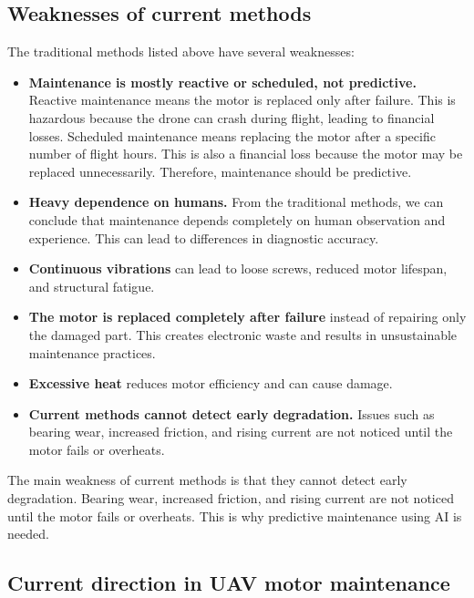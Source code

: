 \subsection*{Weaknesses of current methods}

The traditional methods listed above have several weaknesses:

\begin{itemize}
    \item \textbf{Maintenance is mostly reactive or scheduled, not predictive.} Reactive maintenance means the motor is replaced only after failure. This is hazardous because the drone can crash during flight, leading to financial losses. Scheduled maintenance means replacing the motor after a specific number of flight hours. This is also a financial loss because the motor may be replaced unnecessarily. Therefore, maintenance should be predictive.
    
    \item \textbf{Heavy dependence on humans.} From the traditional methods, we can conclude that maintenance depends completely on human observation and experience. This can lead to differences in diagnostic accuracy.
    
    \item \textbf{Continuous vibrations} can lead to loose screws, reduced motor lifespan, and structural fatigue.
    
    \item \textbf{The motor is replaced completely after failure} instead of repairing only the damaged part. This creates electronic waste and results in unsustainable maintenance practices.
    
    \item \textbf{Excessive heat} reduces motor efficiency and can cause damage.
    
    \item \textbf{Current methods cannot detect early degradation.} Issues such as bearing wear, increased friction, and rising current are not noticed until the motor fails or overheats.
\end{itemize}

The main weakness of current methods is that they cannot detect early degradation. Bearing wear, increased friction, and rising current are not noticed until the motor fails or overheats. This is why predictive maintenance using AI is needed.

\subsection*{Current direction in UAV motor maintenance}

